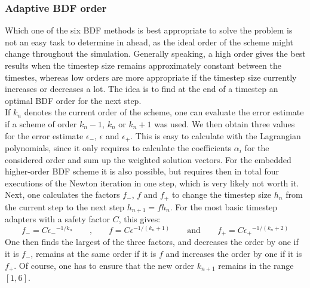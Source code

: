 \subsubsection{Adaptive BDF order}
\label{sssec:adaptiveBDFOrder}
Which one of the six BDF methods is best appropriate to solve the problem is not an easy task to determine in ahead, as the ideal order of the scheme might change throughout the simulation. Generally speaking, a high order gives the best results when the timestep size remains approximately constant between the timestes, whereas low orders are more appropriate if the timestep size currently increases or decreases a lot. The idea is to find at the end of a timestep an optimal BDF order for the next step. \\
If $k_n$ denotes the current order of the scheme, one can evaluate the error estimate if a scheme of order $k_n-1$, $k_n$ or $k_n+1$ was used. We then obtain three values for the error estimate $\epsilon_-$, $\epsilon$ and $\epsilon_+$. This is easy to calculate with the Lagrangian polynomials, since it only requires to calculate the coefficients $\alpha_i$ for the considered order and sum up the weighted solution vectors. For the embedded higher-order BDF scheme it is also possible, but requires then in total four executions of the Newton iteration in one step, which is very likely not worth it. \\
Next, one calculates the factors $f_-$, $f$ and $f_+$ to change the timestep size $h_n$ from the current step to the next step $h_{n+1} = fh_n$. For the most basic timestep adapters with a safety factor $C$, this gives: 
\begin{equation}
	f_- = C{\epsilon_-}^{-1/k_n} \qquad \text{,}\qquad 
	f   = C{\epsilon}^{-1/(k_n+1)} \qquad \text{and}\qquad 
	f_+ = C{\epsilon_+}^{-1/(k_n+2)}
\end{equation}
One then finds the largest of the three factors, and decreases the order by one if it is $f_-$, remains at the same order if it is $f$ and increases the order by one if it is $f_+$. Of course, one has to ensure that the new order $k_{n+1}$ remains in the range $[1,6]$. 

